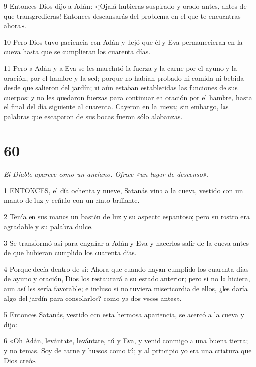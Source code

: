 \par 9 Entonces Dios dijo a Adán: «¡Ojalá hubieras suspirado y orado antes, antes de que transgredieras! Entonces descansarás del problema en el que te encuentras ahora».

\par 10 Pero Dios tuvo paciencia con Adán y dejó que él y Eva permanecieran en la cueva hasta que se cumplieran los cuarenta días.

\par 11 Pero a Adán y a Eva se les marchitó la fuerza y ​​la carne por el ayuno y la oración, por el hambre y la sed; porque no habían probado ni comida ni bebida desde que salieron del jardín; ni aún estaban establecidas las funciones de sus cuerpos; y no les quedaron fuerzas para continuar en oración por el hambre, hasta el final del día siguiente al cuarenta. Cayeron en la cueva; sin embargo, las palabras que escaparon de sus bocas fueron sólo alabanzas.

\chapter{60}

\par \textit{El Diablo aparece como un anciano. Ofrece «un lugar de descanso».}

\par 1 ENTONCES, el día ochenta y nueve, Satanás vino a la cueva, vestido con un manto de luz y ceñido con un cinto brillante.

\par 2 Tenía en sus manos un bastón de luz y su aspecto espantoso; pero su rostro era agradable y su palabra dulce.

\par 3 Se transformó así para engañar a Adán y Eva y hacerlos salir de la cueva antes de que hubieran cumplido los cuarenta días.

\par 4 Porque decía dentro de sí: Ahora que cuando hayan cumplido los cuarenta días de ayuno y oración, Dios los restaurará a su estado anterior; pero si no lo hiciera, aun así les sería favorable; e incluso si no tuviera misericordia de ellos, ¿les daría algo del jardín para consolarlos? como ya dos veces antes».

\par 5 Entonces Satanás, vestido con esta hermosa apariencia, se acercó a la cueva y dijo:

\par 6 «Oh Adán, levántate, levántate, tú y Eva, y venid conmigo a una buena tierra; y no temas. Soy de carne y huesos como tú; y al principio yo era una criatura que Dios creó».


